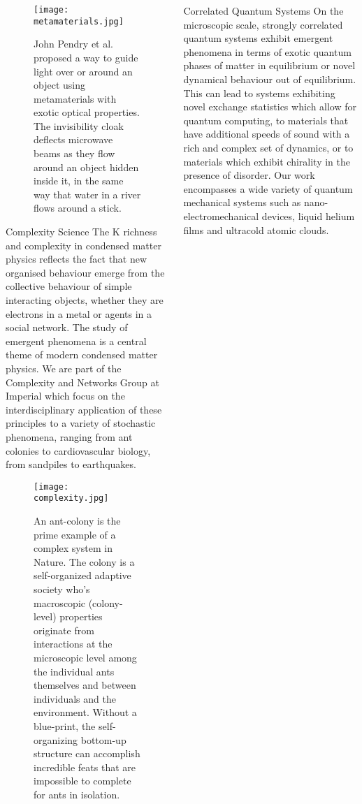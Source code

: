 \documentclass[xcolor={table}]{beamer}
\begin{document}
\begin{frame}[fragile=singleslide,t]
\begin{columns}[onlytextwidth,T]
\begin{column}{.47\textwidth}
\begin{figure}
    \texttt{[image: metamaterials.jpg]}
    \caption{\footnotesize John Pendry et al. proposed a way to guide light over or around an object using metamaterials with exotic optical properties. The invisibility cloak deflects microwave beams as they flow around an object hidden inside it, in the same way that water in a river flows around a stick.}
\end{figure}

\begin{block}{Complexity Science}
The K richness and complexity in condensed matter physics reflects the
fact that new organised behaviour emerge from the collective behaviour of simple
interacting objects, whether they are electrons in a metal or agents in a social
network. The study of emergent phenomena is a central theme of modern condensed
matter physics. We are part of the Complexity and Networks Group at Imperial
which focus on the interdisciplinary application of these principles to a
variety of stochastic phenomena, ranging from ant colonies to cardiovascular
biology, from sandpiles to earthquakes.
\end{block}

\begin{figure}
    \centering
    \texttt{[image: complexity.jpg]}
    \caption{\footnotesize An ant-colony is the prime example of a complex system in Nature. The colony is a self-organized adaptive society who’s macroscopic (colony-level) properties originate from interactions at the microscopic level among the individual ants themselves and between individuals and the environment. Without a blue-print, the self-organizing bottom-up structure can accomplish incredible feats that are impossible to complete for ants in isolation.}
\end{figure}

\end{column}

\begin{column}{.47\textwidth}

\begin{block}{Correlated Quantum Systems}
On the microscopic scale, strongly correlated quantum systems exhibit emergent
phenomena in terms of exotic quantum phases of matter in equilibrium or novel
dynamical behaviour out of equilibrium. This can lead to systems exhibiting
novel exchange statistics which allow for quantum computing, to materials that
have additional speeds of sound with a rich and complex set of dynamics, or to
materials which exhibit chirality in the presence of disorder. Our work
encompasses a wide variety of quantum mechanical systems such as
nano-electromechanical devices, liquid helium films and ultracold atomic clouds.
\end{block}


\end{column}
\end{columns}
\end{frame}
\end{document}
